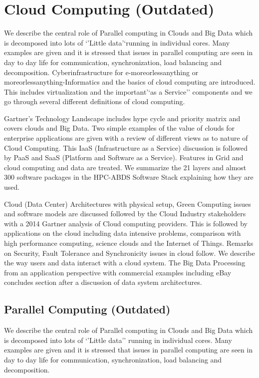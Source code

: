

\chapter{Cloud Computing (Outdated)}

\FILENAME

We describe the central role of Parallel computing in Clouds and Big
Data which is decomposed into lots of `'Little data'`running in
individual cores. Many examples are given and it is stressed that issues
in parallel computing are seen in day to day life for communication,
synchronization, load balancing and decomposition. Cyberinfrastructure
for e-moreorlessanything or moreorlessanything-Informatics and the
basics of cloud computing are introduced. This includes virtualization
and the important'`as a Service'' components and we go through several
different definitions of cloud computing.

Gartner's Technology Landscape includes hype cycle and priority matrix
and covers clouds and Big Data. Two simple examples of the value of
clouds for enterprise applications are given with a review of different
views as to nature of Cloud Computing. This IaaS (Infrastructure as a
Service) discussion is followed by PaaS and SaaS (Platform and Software
as a Service). Features in Grid and cloud computing and data are
treated. We summarize the 21 layers and almost 300 software packages in
the HPC-ABDS Software Stack explaining how they are used.

Cloud (Data Center) Architectures with physical setup, Green Computing
issues and software models are discussed followed by the Cloud Industry
stakeholders with a 2014 Gartner analysis of Cloud computing providers.
This is followed by applications on the cloud including data intensive
problems, comparison with high performance computing, science clouds and
the Internet of Things. Remarks on Security, Fault Tolerance and
Synchronicity issues in cloud follow. We describe the way users and data
interact with a cloud system. The Big Data Processing from an
application perspective with commercial examples including eBay
concludes section after a discussion of data system architectures.

\section{Parallel Computing (Outdated)}

We describe the central role of Parallel computing in Clouds and Big
Data which is decomposed into lots of `'Little data'' running in
individual cores. Many examples are given and it is stressed that issues
in parallel computing are seen in day to day life for communication,
synchronization, load balancing and decomposition.

